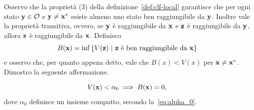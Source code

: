 \begin{steps}
    \item Osservo che la proprietà (3) della definizione~\ref{def:clf-local}
    garantisce che per ogni stato $\mathbf{y} \in \mathcal O$ e $\mathbf{y} \neq \mathbf{x}^*$ esiste
    almeno uno stato ben raggiungibile da $\mathbf{y}$.
    Inoltre vale la proprietà transitiva, ovvero, se $\mathbf{y}$ è raggiungibile da $\mathbf{x}$
    e $\mathbf{z}$ è raggiungibile da $\mathbf{y}$, allora $\mathbf{z}$ è raggiungibile da $\mathbf{x}$.
    Definisco
    \begin{equation*}
        B(\mathbf{x}) = \inf\left\{ V(\mathbf{z})\ |\ \mathbf{z} \text{ è ben raggiungibile da } \mathbf{x} \right\}
    \end{equation*}
    e osservo che, per quanto appena detto, vale che $B(x) < V(x)$ per $\mathbf{x} \neq \mathbf{x}^*$.
    Dimostro la seguente affermazione.

    \begin{aff}
        \begin{equation*}
            V(\mathbf{x}) < \alpha_0 \implies B(\mathbf{x}) = 0,
        \end{equation*}
        dove $\alpha_0$ definisce un insieme compatto, secondo la~\eqref{eq:alpha_0}.
    \end{aff}


\end{steps}
